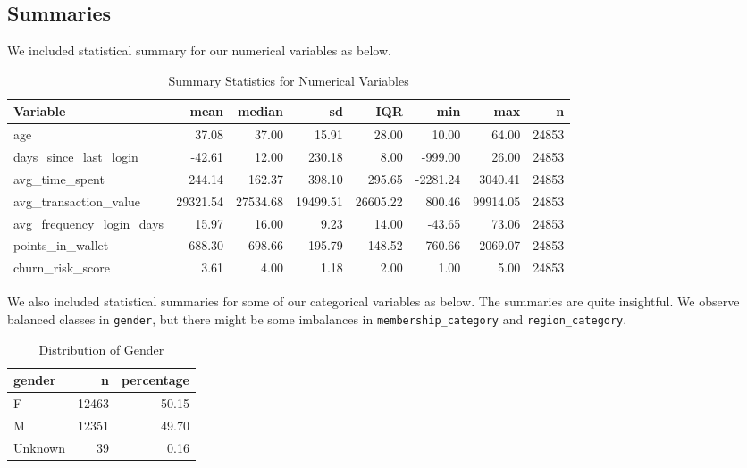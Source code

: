 \documentclass[
  letterpaper,
  DIV=11,
  numbers=noendperiod]{scrartcl}
\begin{document}
\subsection{Summaries}\label{summaries}

We included statistical summary for our numerical variables as below.

\begin{table}[!h]

\caption{Summary Statistics for Numerical Variables}
\centering
\fontsize{10}{12}\selectfont
\begin{tabular}[t]{lrrrrrrr}
\toprule
Variable & mean & median & sd & IQR & min & max & n\\
\midrule
age & 37.08 & 37.00 & 15.91 & 28.00 & 10.00 & 64.00 & 24853\\
days\_since\_last\_login & -42.61 & 12.00 & 230.18 & 8.00 & -999.00 & 26.00 & 24853\\
avg\_time\_spent & 244.14 & 162.37 & 398.10 & 295.65 & -2281.24 & 3040.41 & 24853\\
avg\_transaction\_value & 29321.54 & 27534.68 & 19499.51 & 26605.22 & 800.46 & 99914.05 & 24853\\
avg\_frequency\_login\_days & 15.97 & 16.00 & 9.23 & 14.00 & -43.65 & 73.06 & 24853\\
\addlinespace
points\_in\_wallet & 688.30 & 698.66 & 195.79 & 148.52 & -760.66 & 2069.07 & 24853\\
churn\_risk\_score & 3.61 & 4.00 & 1.18 & 2.00 & 1.00 & 5.00 & 24853\\
\bottomrule
\end{tabular}
\end{table}

We also included statistical summaries for some of our categorical
variables as below. The summaries are quite insightful. We observe
balanced classes in \texttt{gender}, but there might be some imbalances
in \texttt{membership\_category} and \texttt{region\_category}.

\begin{table}[!h]

\caption{Distribution of Gender}
\centering
\fontsize{10}{12}\selectfont
\begin{tabular}[t]{lrr}
\toprule
gender & n & percentage\\
\midrule
F & 12463 & 50.15\\
M & 12351 & 49.70\\
Unknown & 39 & 0.16\\
\bottomrule
\end{tabular}
\end{table}
\end{document}
